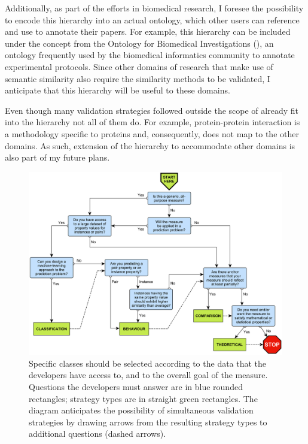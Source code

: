 Additionally, as part of the efforts in biomedical research, I foresee the possibility to encode this hierarchy into an actual ontology, which other users can reference and use to annotate their papers. For example, this hierarchy can be included under the concept  from the Ontology for Biomedical Investigations (), an ontology frequently used by the biomedical informatics community to annotate experimental protocols. Since other domains of research that make use of semantic similarity also require the similarity methods to be validated, I anticipate that this hierarchy will be useful to these domains.

Even though many validation strategies followed outside the scope of  already fit into the hierarchy not all of them do. For example, protein-protein interaction is a methodology specific to proteins and, consequently, does not map to the other domains. As such, extension of the hierarchy to accommodate other domains is also part of my future plans.

\begin{figure}
    \centering
    \begin{turn}{90}
    \includegraphics[width=0.8\textheight]{images/diagram.pdf}
    \end{turn}
    \caption[Pipeline to assist semantic similarity developers in the validation step]{Specific classes should be selected according to the data that the developers have access to, and to the overall goal of the measure. Questions the developers must answer are in blue rounded rectangles; strategy types are in straight green rectangles. The diagram anticipates the possibility of simultaneous validation strategies by drawing arrows from the resulting strategy types to additional questions (dashed arrows).}
    \label{fig:diagram}
\end{figure}
